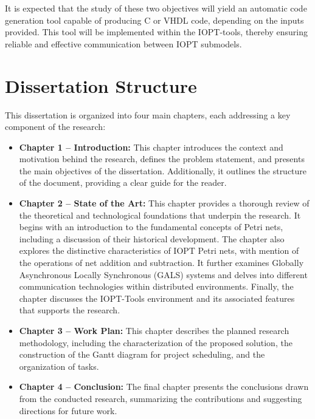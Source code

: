 It is expected that the study of these two objectives will yield an automatic code generation tool capable of producing C or VHDL code, depending on the inputs provided. This tool will be implemented within the IOPT-tools, thereby ensuring reliable and effective communication between IOPT submodels.





\section{Dissertation Structure}
\label{sec:dissertation_structure}


This dissertation is organized into four main chapters, each addressing a key component of the research:

\begin{itemize}
    \item \textbf{Chapter 1 – Introduction:}  
    This chapter introduces the context and motivation behind the research, defines the problem statement, and presents the main objectives of the dissertation. Additionally, it outlines the structure of the document, providing a clear guide for the reader.

   \item \textbf{Chapter 2 – State of the Art:}  
This chapter provides a thorough review of the theoretical and technological foundations that underpin the research. It begins with an introduction to the fundamental concepts of Petri nets, including a discussion of their historical development. The chapter also explores the distinctive characteristics of IOPT Petri nets, with mention of the operations of net addition and subtraction. It further examines Globally Asynchronous Locally Synchronous (GALS) systems and delves into different communication technologies within distributed environments. Finally, the chapter discusses the IOPT-Tools environment and its associated features that supports the research.

    \item \textbf{Chapter 3 – Work Plan:}  
    This chapter describes the planned research methodology, including the characterization of the proposed solution, the construction of the Gantt diagram for project scheduling, and the organization of tasks.

    \item \textbf{Chapter 4 – Conclusion:}  
    The final chapter presents the conclusions drawn from the conducted research, summarizing the contributions and suggesting directions for future work.
\end{itemize}


